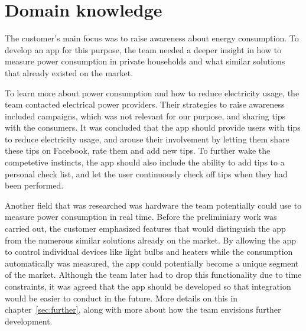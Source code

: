 \section{Domain knowledge}
The customer's main focus was to raise awareness about energy consumption. To develop an app for this purpose, the team needed a deeper insight in how to measure power consumption in private households and what similar solutions that already existed on the market.

To learn more about power consumption and how to reduce electricity usage, the team contacted electrical power providers. Their strategies to raise awareness included campaigns, which was not relevant for our purpose, and sharing tips with the consumers. It was concluded that the app should provide users with tips to reduce electricity usage, and arouse their involvement by letting them share these tips on Facebook, rate them and add new tips. To further wake the competetive instincts, the app should also include the ability to add tips to a personal check list, and let the user continuously check off tips when they had been performed.

Another field that was researched was hardware the team potentially could use to measure power consumption in real time. Before the preliminiary work was carried out, the customer emphasized features that would distinguish the app from the numerous similar solutions already on the market. By allowing the app to control individual devices like light bulbs and heaters while the consumption automatically was measured, the app could potentially become a unique segment of the market. Although the team later had to drop this functionality due to time constraints, it was agreed that the app should be developed so that integration would be easier to conduct in the future. More details on this in chapter~\ref{sec:further}, along with more about how the team envisions further development.

